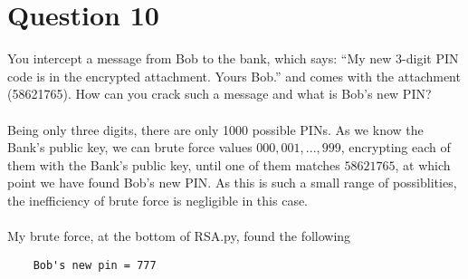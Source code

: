 \documentclass[a4paper,12pt]{article}
\begin{document}
\section*{Question 10}
You intercept a message from Bob to the bank, which says: “My new 3-digit PIN code is in the encrypted attachment. Yours Bob.” and comes with the attachment (58621765). How can you crack such a message and what is Bob’s new PIN?\\\\
Being only three digits, there are only 1000 possible PINs. As we know the Bank's public key, we can brute force values $000, 001, ..., 999$, encrypting each of them with the Bank's public key, until one of them matches $58621765$, at which point we have found Bob's new PIN. As this is such a small range of possiblities, the inefficiency of brute force is negligible in this case.\\\\My brute force, at the bottom of RSA.py, found the following
\begin{verbatim}
    Bob's new pin = 777
\end{verbatim}
\end{document}
